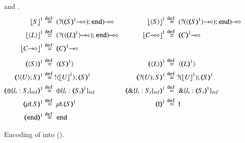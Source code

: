 \begin{figure}[t!]
 and .
\\[1mm]
\begin{align*}
	\vtmap{{S}}{1} & \defeq	\lhot{(\btinp{\lhot{\tmap{S}{1}}} \tinact)}
	&  
	\vtmap{\chtype{S}}{1} & \defeq	\lhot{(\btinp{\shot{\chtype{\tmap{S}{1}}}} \tinact)}
	\\
	\vtmap{\chtype{L}}{1} & \defeq	\lhot{(\btinp{\shot{\chtype{\tmap{L}{1}}}} \tinact)}
	&  
	\vtmap{\lhot{C}}{1} & \defeq \lhot{\tmap{C}{1}}
	\\
	\vtmap{\shot{C}}{1} & \defeq\shot{\tmap{C}{1}}
	\\[1mm]
	\tmap{\chtype{S}}{1} & \defeq	\chtype{\tmap{S}{1}} 
	&
	\tmap{\chtype{L}}{1} & \defeq\chtype{\tmap{L}{1}}
	\\
	\tmap{\btout{U} S}{1} & \defeq \btout{{\vtmap{U}{1}}} \tmap{S}{1}
	&
	\tmap{\btinp{U} S}{1} & \defeq\btinp{{\vtmap{U}{1}}} \tmap{S}{1}
	\\
	\tmap{\btsel{l_i: S_i}_{i \in I}}{1} & \defeq \btsel{l_i: \tmap{S_i}{1}}_{i \in I}
	&
	\tmap{\btbra{l_i: S_i}_{i \in I}}{1} & \defeq \btbra{l_i: \tmap{S_i}{1}}_{i \in I}
	\\
	\tmap{\trec{t}{S}}{1}  & \defeq \trec{t}{\tmap{S}{1}}
		&
		\tmap{\vart{t}}{1} & \defeq \vart{t} 
			\\
		\tmap{\tinact}{1}  & \defeq  \tinact
\end{align*}
%
\caption{\label{f:enc:hopi_to_ho}Encoding of \HOp into \HO ().}
\end{figure}

